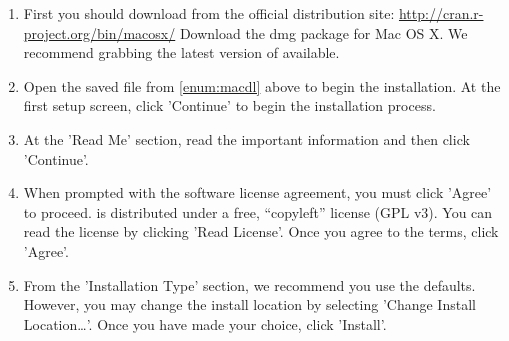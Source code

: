 \begin{enumerate}
  \item First you should download  from the official distribution site: \url{http://cran.r-project.org/bin/macosx/} \label{enum:macdl}
  Download the  dmg package for Mac OS X.  We recommend grabbing the latest version of  available.
  \item Open the saved file from \ref{enum:macdl} above to begin the installation.  At the first setup screen, click 'Continue' to begin the installation process.
  \item At the 'Read Me' section, read the important information and then click 'Continue'.
  \item When prompted with the software license agreement, you must click 'Agree' to proceed.   is distributed under a free, ``copyleft'' license (GPL v3).  You can read the license by clicking 'Read License'.  Once you agree to the terms, click 'Agree'.
  \item From the 'Installation Type' section, we recommend you use the defaults.  However, you may change the install location by selecting 'Change Install Location\dots'.  Once you have made your choice, click 'Install'.

\end{enumerate}
